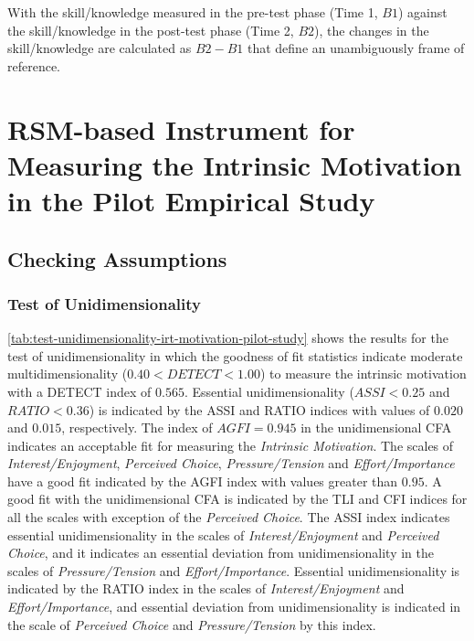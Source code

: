 With the skill/knowledge measured in the pre-test phase (Time 1, $B1$) against the skill/knowledge in the post-test phase (Time 2, $B2$), the changes in the skill/knowledge are calculated as $B2-B1$ that define an unambiguously frame of reference.


\section{RSM-based Instrument for Measuring the Intrinsic Motivation in the Pilot Empirical Study}
\label{sec:irt-motivation-pilot-study}

\subsection{Checking Assumptions}

\subsubsection*{Test of Unidimensionality}

\autoref{tab:test-unidimensionality-irt-motivation-pilot-study} shows the results for the test of unidimensionality in which the goodness of fit statistics indicate moderate multidimensionality ($0.40 < DETECT < 1.00$) to measure the intrinsic motivation with a DETECT index of $0.565$. Essential unidimensionality ($ASSI < 0.25$ and $RATIO < 0.36$) is indicated by the ASSI and RATIO indices with values of $0.020$ and $0.015$, respectively. The index of $AGFI = 0.945$ in the unidimensional CFA indicates an acceptable fit for measuring the \emph{Intrinsic Motivation}. The scales of \emph{Interest/Enjoyment}, \emph{Perceived Choice}, \emph{Pressure/Tension} and \emph{Effort/Importance} have a good fit indicated by the AGFI index with values greater than $0.95$. A good fit with the unidimensional CFA is indicated by the TLI and CFI indices for all the scales with exception of the \emph{Perceived Choice}. The ASSI index indicates essential unidimensionality in the scales of \emph{Interest/Enjoyment} and \emph{Perceived Choice}, and it indicates an essential deviation from unidimensionality in the scales of \emph{Pressure/Tension} and \emph{Effort/Importance}. Essential unidimensionality is indicated by the RATIO index in the scales of \emph{Interest/Enjoyment} and \emph{Effort/Importance}, and essential deviation from unidimensionality is indicated in the scale of \emph{Perceived Choice} and \emph{Pressure/Tension} by this index.

